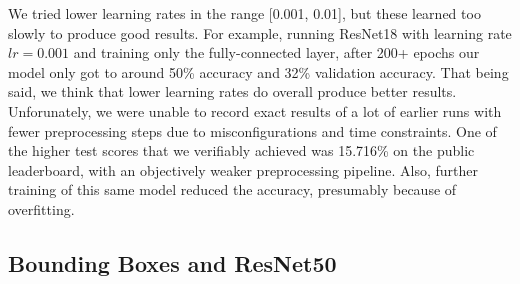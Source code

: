 We tried lower learning rates in the range [0.001, 0.01], but these learned too slowly to produce good results. For example, running ResNet18 with learning rate $lr = 0.001$ and training only the fully-connected layer, after 200+ epochs our model only got to around 50\% accuracy and 32\% validation accuracy. That being said, we think that lower learning rates do overall produce better results. Unforunately, we were unable to record exact results of a lot of earlier runs with fewer preprocessing steps due to misconfigurations and time constraints. One of the higher test scores that we verifiably achieved was 15.716\% on the public leaderboard, with an objectively weaker preprocessing pipeline. Also, further training of this same model reduced the accuracy, presumably because of overfitting.

\subsection{Bounding Boxes and ResNet50}